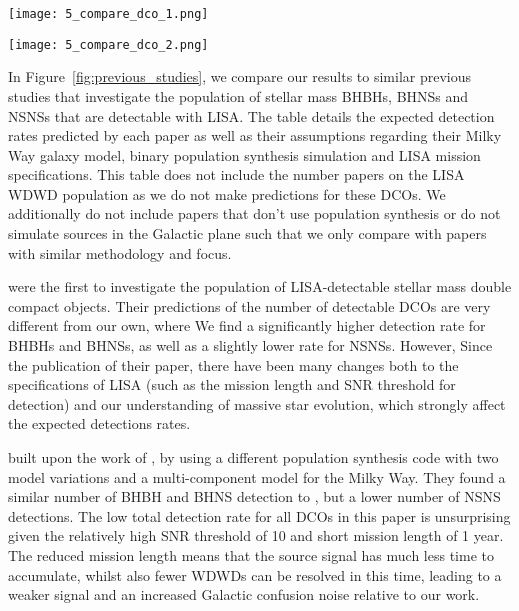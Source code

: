 \begin{figure*}[p]
    \centering
    \texttt{[image: 5\_compare\_dco\_1.png]}

    \vspace{0.5cm}

    \texttt{[image: 5\_compare\_dco\_2.png]}
    \caption{A table comparing previous studies of a similar nature to this work. The works listed in the table are \citet{Nelemans+2001,Belczynski+2010,Liu+2014,Lamberts+2018,Lau+2020,Breivik+2020,Sesana+2020}.}
    \label{fig:previous_studies}
\end{figure*}

In Figure~\ref{fig:previous_studies}, we compare our results to similar previous studies that investigate the population of stellar mass BHBHs, BHNSs and NSNSs that are detectable with LISA. The table details the expected detection rates predicted by each paper as well as their assumptions regarding their Milky Way galaxy model, binary population synthesis simulation and LISA mission specifications. This table does not include the number papers on the LISA WDWD population as we do not make predictions for these DCOs. We additionally do not include papers that don't use population synthesis or do not simulate sources in the Galactic plane \citep[e.g.][]{Andrews+2020, Kremer+2018} such that we only compare with papers with similar methodology and focus.
 
\citet{Nelemans+2001} were the first to investigate the population of LISA-detectable stellar mass double compact objects. Their predictions of the number of detectable DCOs are very different from our own, where  We find a significantly higher detection rate for BHBHs and BHNSs, as well as a slightly lower rate for NSNSs. However, Since the publication of their paper, there have been many changes both to the specifications of LISA (such as the mission length and SNR threshold for detection) and our understanding of massive star evolution, which strongly affect the expected detections rates.

\citet{Belczynski+2010} built upon the work of \citet{Nelemans+2001}, by using a different population synthesis code with two model variations and a multi-component model for the Milky Way. They found a similar number of BHBH and BHNS detection to \citet{Nelemans+2001}, but a lower number of NSNS detections. The low total detection rate for all DCOs in this paper is unsurprising given the relatively high SNR threshold of 10 and short mission length of 1 year. The reduced mission length means that the source signal has much less time to accumulate, whilst also fewer WDWDs can be resolved in this time, leading to a weaker signal and an increased Galactic confusion noise relative to our work.



